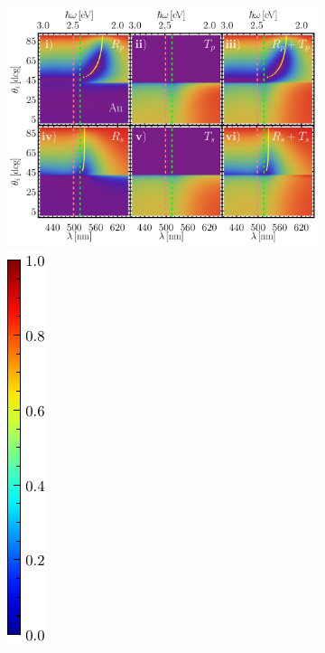 \begin{figure}[h!]\centering
	\begin{subfigure}{.01\linewidth}\caption{}\label{sfig:RT-4}\vspace{6.5cm}\end{subfigure}
	\begin{subfigure}{.7\linewidth}\hspace*{-.5em}
	\includegraphics[scale=.58]{2-Resultados/figs/10-RT-AuAg/0-2D_Grid_1.png}%
	\includegraphics[scale=.89, trim={00 -5 00 00}, clip]{2-Resultados/figs/0-IBar_v}
	\end{subfigure}\\

\end{figure}
